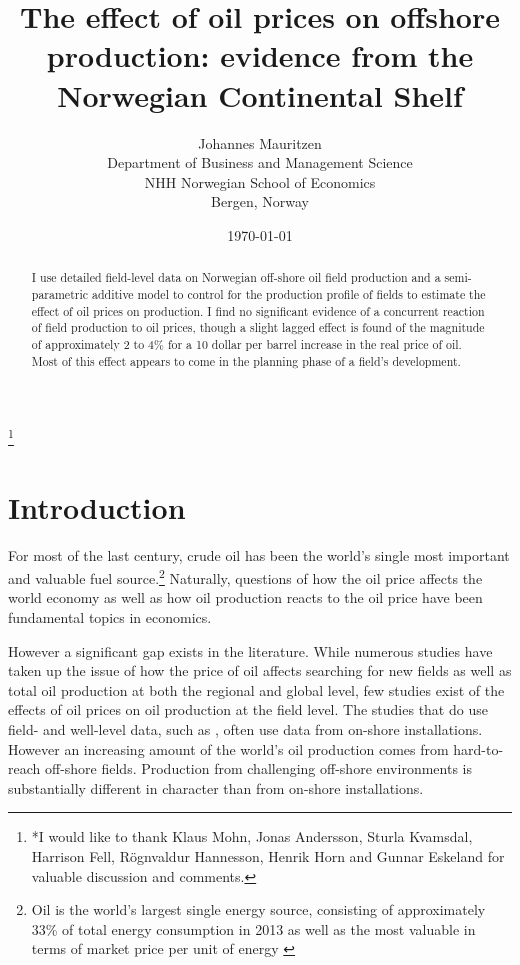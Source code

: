 \documentclass[12pt]{article}
\title{The effect of oil prices on offshore production: evidence from the Norwegian Continental Shelf}
\author{Johannes Mauritzen\\
		Department of Business and Management Science\\
        NHH Norwegian School of Economics\\
        Bergen, Norway\\
		}
\date{\today}
\begin{document}
\begin{spacing}{1} %
	\maketitle


\begin{abstract}
I use detailed field-level data on Norwegian off-shore oil field production and a semi-parametric additive model to control for the production profile of fields to estimate the effect of oil prices on production.  I find no significant evidence of a concurrent reaction of field production to oil prices, though a slight lagged effect is found of the magnitude of approximately 2 to 4\% for a 10 dollar per barrel increase in the real price of oil.  Most of this effect appears to come in the planning phase of a field's development.
\end{abstract}

\thanks{*I would like to thank Klaus Mohn, Jonas Andersson, Sturla Kvamsdal, Harrison Fell, R\"ognvaldur Hannesson, Henrik Horn and Gunnar Eskeland for valuable discussion and comments.}

\end{spacing}

\section{Introduction}

For most of the last century, crude oil has been the world’s single most important and valuable fuel source.\footnote{Oil is the world's largest single energy source, consisting of approximately 33\% of total energy consumption in 2013 as well as the most valuable in terms of market price per unit of energy \citep{british_petroleum_statistical_2013}} Naturally, questions of how the oil price affects the world economy as well as how oil production reacts to the oil price have been fundamental topics in economics. 

However a significant gap exists in the literature.  While numerous studies have taken up the issue of how the price of oil affects searching for new fields as well as total oil production at both the regional and global level, few studies exist of the effects of oil prices on oil production at the field level.  The studies that do use field- and well-level data, such as \citet{rao_taxation_2010}, often use data from on-shore installations.  However an increasing amount of the world's oil production comes from hard-to-reach off-shore fields.  Production from challenging off-shore environments is substantially different in character than from on-shore installations.
\end{document}
